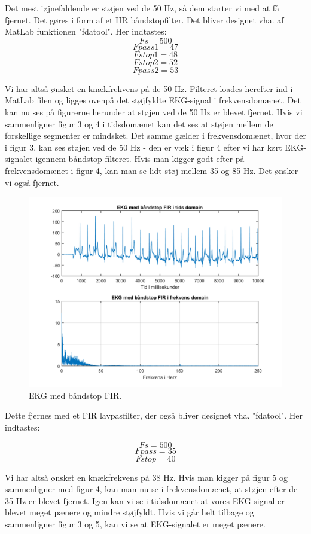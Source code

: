 \documentclass[12pt, letterpaper]{article}
\begin{document}
Det mest iøjnefaldende er støjen ved de 50 Hz, så dem starter vi med at få fjernet. Det gøres i form af et IIR båndstopfilter. Det bliver designet vha. af MatLab funktionen "fdatool". Her indtastes:
$$ Fs = 500 $$
$$ Fpass1 = 47 $$
$$ Fstop1 = 48 $$
$$ Fstop2 = 52 $$
$$ Fpass2 = 53 $$

Vi har altså ønsket en knækfrekvens på de 50 Hz. 
Filteret loades herefter ind i MatLab filen og ligges ovenpå det støjfyldte EKG-signal i frekvensdomænet. 
Det kan nu ses på figurerne herunder at støjen ved de 50 Hz er blevet fjernet. Hvis vi sammenligner figur 3 og 4 i tidsdomænet kan det ses at støjen mellem de forskellige segmenter er mindsket. Det samme gælder i frekvensdomænet, hvor der i figur 3, kan ses støjen ved de 50 Hz - den er væk i figur 4 efter vi har kørt EKG-signalet igennem båndstop filteret.  
Hvis man kigger godt efter på frekvensdomænet i figur 4, kan man se lidt støj mellem 35 og 85 Hz. Det ønsker vi også fjernet. 

\begin{figure}[H]
           \includegraphics[width=\linewidth]{billeder/EKGstopbandFIR}	   							\caption{EKG med båndstop FIR.}
\end{figure}

Dette fjernes med et FIR lavpasfilter, der også bliver designet vha. "fdatool". Her indtastes: 

$$ Fs = 500 $$
$$ Fpass = 35 $$
$$ Fstop = 40 $$

Vi har altså ønsket en knækfrekvens på 38 Hz. 
Hvis man kigger på figur 5 og sammenligner med figur 4, kan man nu se i frekvensdomænet, at støjen efter de 35 Hz er blevet fjernet.
Igen kan vi se i tidsdomænet at vores EKG-signal er blevet meget pænere og mindre støjfyldt. Hvis vi går helt tilbage og sammenligner figur 3 og 5, kan vi se at EKG-signalet er meget pænere. 
\end{document}
